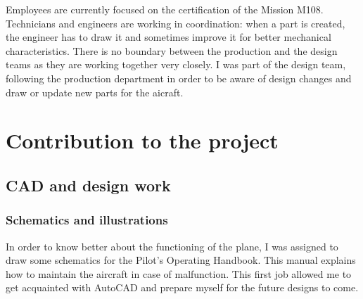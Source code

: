\documentclass[11pt,a4paper]{article}
\begin{document}
\bigskip

Employees are currently focused on the certification of the Mission M108. Technicians and engineers are working in coordination: when a part is created, the engineer has to draw it and sometimes improve it for better mechanical characteristics. There is no boundary between the production and the design teams as they are working together very closely. I was part of the design team, following the production department in order to be aware of design changes and draw or update new parts for the aicraft.

\newpage

\section{Contribution to the project}
\subsection{CAD and design work}
\subsubsection{Schematics and illustrations}

In order to know better about the functioning of the plane, I was assigned to draw some schematics for the Pilot's Operating Handbook. This manual explains how to maintain the aircraft in case of malfunction. This first job allowed me to get acquainted with AutoCAD and prepare myself for the future designs to come. 
\end{document}
